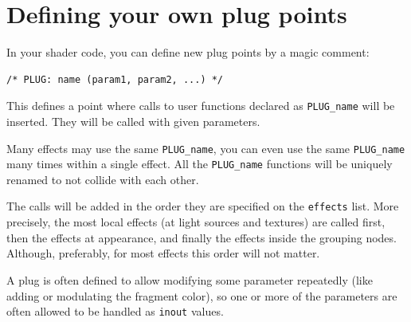 \documentclass{egpubl}
\newenvironment{mycode}
{\begin{mycodecore}}
{\end{mycodecore}
\vspace{-0.1in}}
\begin{document}


\section{Defining your own plug points}

In your shader code, you can define new plug points by a
magic comment:

\begin{mycode}
\begin{Verbatim}[commandchars=\\\{\},fontsize=\small]
/* PLUG: name (param1, param2, ...) */
\end{Verbatim}
\end{mycode}

This defines a point where calls to user functions declared as
\texttt{PLUG\_name} will be inserted. They will be called with given
parameters.

Many effects may use the same \texttt{PLUG\_name},
you can even use the same \texttt{PLUG\_name} many times within a single
effect. All the \texttt{PLUG\_name} functions
will be uniquely renamed to not collide with each other.

The calls will be added in the order they are specified on the
\texttt{effects} list. More precisely, the most local effects
(at light sources and textures) are called first, then the effects
at appearance, and finally the effects inside the grouping nodes.
Although, preferably, for most effects this order will not matter.

A plug is often defined to allow modifying some parameter
repeatedly (like adding or modulating the fragment color),
so one or more of the parameters are often allowed to be handled
as \texttt{inout} values.
\end{document}
